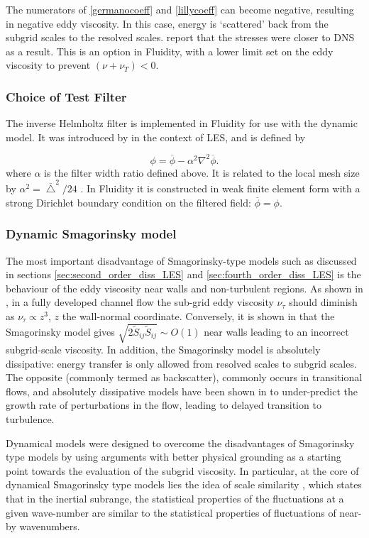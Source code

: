 The numerators of \eqref{germanocoeff} and \eqref{lillycoeff} can become negative, resulting in negative eddy viscosity. In this case, energy is `scattered' back from the subgrid scales to the resolved scales. \citet{germano1991} report that the stresses were closer to DNS as a result. This is an option in Fluidity, with a lower limit set on the eddy viscosity to prevent $(\nu + \nu_T) < 0$.

\subsubsection{Choice of Test Filter}\label{lesfilter}

The inverse Helmholtz filter is implemented in Fluidity for use with the dynamic model. It was introduced by \citet{germano1986a} in the context of LES, and is defined by

\begin{equation}\label{invhelm}
\phi = \overline \phi - \alpha^2 \nabla^2 \overline \phi.
\end{equation}
where $\alpha$ is the filter width ratio defined above. It is related to the local mesh size by $\alpha^2 = \overline \bigtriangleup^2/24$ \citep{pope2000}. In Fluidity it is constructed in weak finite element form with a strong Dirichlet boundary condition on the filtered field: $\overline \phi = \phi$.

\subsubsection{Dynamic Smagorinsky model}

The most important disadvantage of Smagorinsky-type models such as discussed in sections \ref{sec:second_order_diss_LES} and \ref{sec:fourth_order_diss_LES} is the behaviour of the eddy viscosity near walls and non-turbulent regions. As shown in \citet{pope2000}, in a fully developed channel flow the sub-grid eddy viscosity $\nu_\tau$ should diminish as $\nu_\tau \propto z^3$, $z$ the wall-normal coordinate. Conversely, it is shown in \citet{nicoud1999} that the Smagorinsky model gives $\sqrt{2 \tilde{S}_{ij} \tilde{S}_{ij}} \sim O(1)$ near walls leading to an incorrect subgrid-scale viscosity. In addition, the Smagorinsky model is absolutely dissipative: energy transfer is only allowed from resolved scales to subgrid scales. The opposite (commonly termed as backscatter), commonly occurs in transitional flows, and absolutely dissipative models have been shown in \citet{piomelli1990} to under-predict the growth rate of perturbations in the flow, leading to delayed transition to turbulence.%
\par
Dynamical models were designed to overcome the disadvantages of Smagorinsky type models by using arguments with better physical grounding as a starting point towards the evaluation of the subgrid viscosity. In particular, at the core of dynamical Smagorinsky type models lies the idea of scale similarity \citep{bardina1980}, which states that in the inertial subrange, the statistical properties of the fluctuations at a given wave-number are similar to the statistical properties of fluctuations of near-by wavenumbers.

